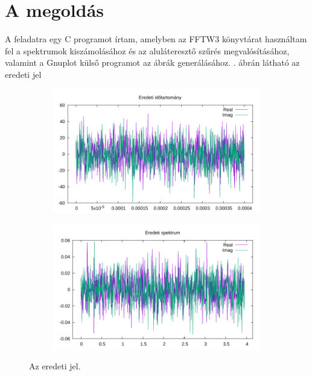 \section{A megoldás}
	A feladatra egy C programot írtam, amelyben az FFTW3 \cite{FFTW3} könyvtárat használtam fel a spektrumok kiszámolásához és az aluláteresztő szűrés megvalósításához, valamint a Gnuplot \cite{Gnuplot} külső programot az ábrák generálásához. . ábrán látható az eredeti jel
	\begin{figure}[h!]
		\centering
		\begin{subfigure}{0.98\textwidth}
			\includegraphics[width=\textwidth]{kep/original_samples.pdf}
		\end{subfigure}
		\begin{subfigure}{0.98\textwidth}
			\includegraphics[width=\textwidth]{kep/original_spectrum.pdf}
		\end{subfigure}
		\caption{Az eredeti jel.}
		\label{fig:original}
	\end{figure}
